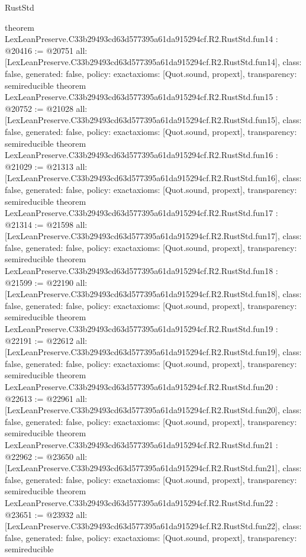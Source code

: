 \begin{lexlean}{RustStd}
\begin{coremodule}
{}
theorem LexLeanPreserve.C33b29493cd63d577395a61da915294cf.R2.RustStd.fun14 : @20416 := @20751 {
  all: [LexLeanPreserve.C33b29493cd63d577395a61da915294cf.R2.RustStd.fun14],
  class: false,
  generated: false,
  policy: exact{axioms: [Quot.sound, propext]},
  transparency: semireducible
}
theorem LexLeanPreserve.C33b29493cd63d577395a61da915294cf.R2.RustStd.fun15 : @20752 := @21028 {
  all: [LexLeanPreserve.C33b29493cd63d577395a61da915294cf.R2.RustStd.fun15],
  class: false,
  generated: false,
  policy: exact{axioms: [Quot.sound, propext]},
  transparency: semireducible
}
theorem LexLeanPreserve.C33b29493cd63d577395a61da915294cf.R2.RustStd.fun16 : @21029 := @21313 {
  all: [LexLeanPreserve.C33b29493cd63d577395a61da915294cf.R2.RustStd.fun16],
  class: false,
  generated: false,
  policy: exact{axioms: [Quot.sound, propext]},
  transparency: semireducible
}
theorem LexLeanPreserve.C33b29493cd63d577395a61da915294cf.R2.RustStd.fun17 : @21314 := @21598 {
  all: [LexLeanPreserve.C33b29493cd63d577395a61da915294cf.R2.RustStd.fun17],
  class: false,
  generated: false,
  policy: exact{axioms: [Quot.sound, propext]},
  transparency: semireducible
}
theorem LexLeanPreserve.C33b29493cd63d577395a61da915294cf.R2.RustStd.fun18 : @21599 := @22190 {
  all: [LexLeanPreserve.C33b29493cd63d577395a61da915294cf.R2.RustStd.fun18],
  class: false,
  generated: false,
  policy: exact{axioms: [Quot.sound, propext]},
  transparency: semireducible
}
theorem LexLeanPreserve.C33b29493cd63d577395a61da915294cf.R2.RustStd.fun19 : @22191 := @22612 {
  all: [LexLeanPreserve.C33b29493cd63d577395a61da915294cf.R2.RustStd.fun19],
  class: false,
  generated: false,
  policy: exact{axioms: [Quot.sound, propext]},
  transparency: semireducible
}
theorem LexLeanPreserve.C33b29493cd63d577395a61da915294cf.R2.RustStd.fun20 : @22613 := @22961 {
  all: [LexLeanPreserve.C33b29493cd63d577395a61da915294cf.R2.RustStd.fun20],
  class: false,
  generated: false,
  policy: exact{axioms: [Quot.sound, propext]},
  transparency: semireducible
}
theorem LexLeanPreserve.C33b29493cd63d577395a61da915294cf.R2.RustStd.fun21 : @22962 := @23650 {
  all: [LexLeanPreserve.C33b29493cd63d577395a61da915294cf.R2.RustStd.fun21],
  class: false,
  generated: false,
  policy: exact{axioms: [Quot.sound, propext]},
  transparency: semireducible
}
theorem LexLeanPreserve.C33b29493cd63d577395a61da915294cf.R2.RustStd.fun22 : @23651 := @23932 {
  all: [LexLeanPreserve.C33b29493cd63d577395a61da915294cf.R2.RustStd.fun22],
  class: false,
  generated: false,
  policy: exact{axioms: [Quot.sound, propext]},
  transparency: semireducible
}
\end{coremodule}
\end{lexlean}
